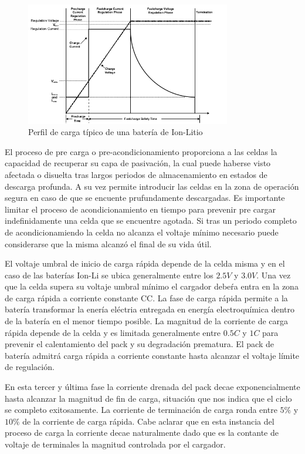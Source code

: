 \documentclass[10pt,a4paper]{article}
\begin{document}
\begin{figure}[h!] \centering
    \includegraphics[width=0.8\textwidth]{bat_char/char_profile.png}
    \caption{Perfil de carga típico de una batería de Ion-Litio}
\label{fig:char_prof} \end{figure} \FloatBarrier

El proceso de pre carga o pre-acondicionamiento proporciona a las celdas la
capacidad de recuperar su capa de pasivación, la cual puede haberse visto
afectada o disuelta tras largos periodos de almacenamiento en estados de
descarga profunda. A su vez permite introducir las celdas en la zona de
operación segura en caso de que se encuente prufundamente descargadas.  Es
importante limitar el proceso de acondicionamiento en tiempo para prevenir pre
cargar indefinidamente una celda que se encuentre agotada. Si tras un periodo
completo de acondicionamiendo la celda no alcanza el voltaje mínimo necesario
puede considerarse que la misma alcanzó el final de su vida útil.

El voltaje umbral de inicio de carga rápida depende de la celda misma y en el
caso de las baterías \acrshort{Ion-Li} se ubica generalmente entre los $2.5V$ y
$3.0V$.  Una vez que la celda supera su voltaje umbral mínimo el cargador debeŕa
entra en la zona de carga rápida a corriente constante \acrshort{CC}. La fase de
carga rápida permite a la batería transformar la enería eléctria entregada en
energía electroquímica dentro de la batería en el menor tiempo posible. La
magnitud de la corriente de carga rápida depende de la celda y es limitada
generalmente entre $0.5C$ y $1C$ para prevenir el calentamiento del pack y su
degradación prematura. El pack de batería admitrá carga rápida a corriente
constante hasta alcanzar el voltaje límite de regulación. 

En esta tercer y última fase la corriente drenada del pack decae
exponencialmente hasta alcanzar la magnitud de fin de carga, situación que nos
indica que el ciclo se completo exitosamente. La corriente de terminación de
carga ronda entre $5\%$ y $10 \%$ de la corriente de carga rápida. Cabe aclarar
que en esta instancia del proceso de carga la corriente decae naturalmente dado
que es la contante de voltaje de terminales la magnitud controlada por el
cargador.  
\end{document}
